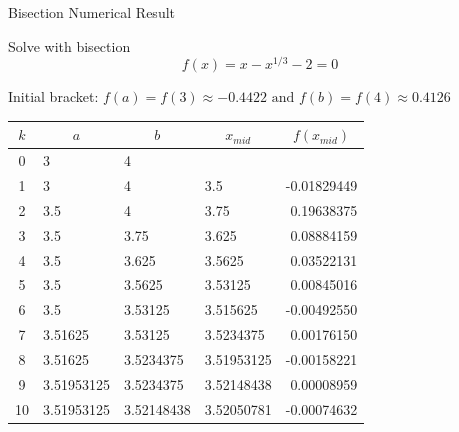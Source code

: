 \documentclass[10pt]{beamer}
\begin{document}
\begin{frame}{Bisection Numerical Result}

Solve with bisection
\begin{equation*}
   f(x) = x - x^{1/3} - 2 = 0
\end{equation*}

Initial bracket: $f(a) = f(3) \approx -0.4422 \mbox{ and } f(b) = f(4) \approx 0.4126$

\begin{center}
  \small
  \renewcommand{\arraystretch}{1.3}
    \begin{tabular}{clllr}
     $k$ & \multicolumn{1}{c}{$a$}
         & \multicolumn{1}{c}{$b$}
         &  \multicolumn{1}{c}{$x_{mid}$}
         & \multicolumn{1}{c}{$f(x_{mid})$} \\ \hline
      0 &  3           & 4          &             &             \\
      1 &  3           & 4          & 3.5         & -0.01829449 \\
      2 &  3.5         & 4          & 3.75        &  0.19638375 \\
      3 &  3.5         & 3.75       & 3.625       &  0.08884159 \\
      4 &  3.5         & 3.625      & 3.5625      &  0.03522131 \\
      5 &  3.5         & 3.5625     & 3.53125     &  0.00845016 \\
      6 &  3.5         & 3.53125    & 3.515625    & -0.00492550 \\
      7 &  3.51625     & 3.53125    & 3.5234375   &  0.00176150 \\
      8 &  3.51625     & 3.5234375  & 3.51953125  & -0.00158221 \\
      9 &  3.51953125  & 3.5234375  & 3.52148438  &  0.00008959 \\
     10 &  3.51953125  & 3.52148438 & 3.52050781  & -0.00074632 \\
    \end{tabular}
\end{center}

\end{frame}

\end{document}
